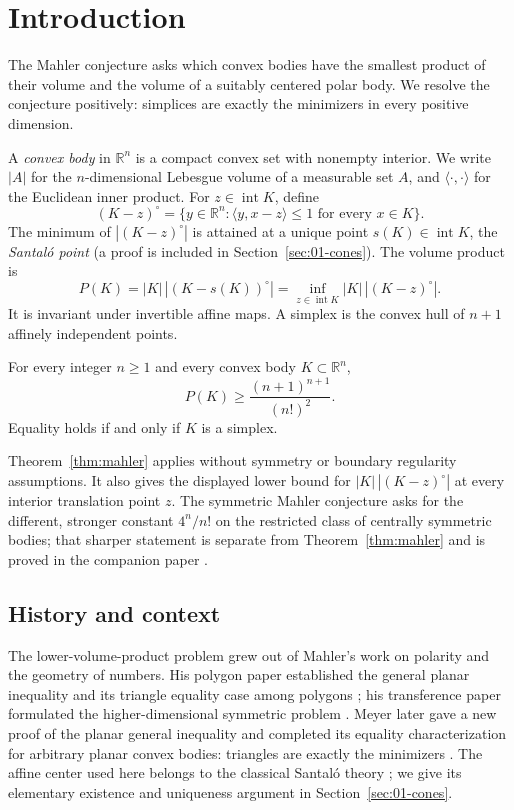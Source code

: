 \section{Introduction}\label{sec:introduction}

The Mahler conjecture asks which convex bodies have the smallest product
of their volume and the volume of a suitably centered polar body.
We resolve the conjecture positively: simplices are exactly the minimizers
in every positive dimension.

A \emph{convex body} in $\mathbb R^n$ is a compact convex set with nonempty
interior.  We write $|A|$ for the $n$-dimensional Lebesgue volume of a measurable
set $A$, and $\langle\cdot,\cdot\rangle$ for the Euclidean inner product.
For $z\in\operatorname{int}K$, define
\[
 (K-z)^\circ
 =\{y\in\mathbb R^n:\langle y,x-z\rangle\le1\text{ for every }x\in K\}.
\]
The minimum of $|(K-z)^\circ|$ is attained at a unique point
$s(K)\in\operatorname{int}K$, the \emph{Santal\'o point}
(a proof is included in Section~\ref{sec:01-cones}). The volume product is
\[
 P(K)=|K|\,|(K-s(K))^\circ|
     =\inf_{z\in\operatorname{int}K}|K|\,|(K-z)^\circ|.
\]
It is invariant under invertible affine maps.
A simplex is the convex hull of $n+1$ affinely independent points.

\begin{theorem}\label{thm:mahler}
For every integer $n\ge1$ and every convex body $K\subset\mathbb R^n$,
\[
                 P(K)\ge\frac{(n+1)^{n+1}}{(n!)^2}.
\]
Equality holds if and only if $K$ is a simplex.
\end{theorem}

Theorem~\ref{thm:mahler} applies without symmetry or boundary regularity assumptions.
It also gives the displayed lower bound for
$|K|\,|(K-z)^\circ|$ at every interior translation point $z$.
The symmetric Mahler conjecture asks for the different, stronger constant
$4^n/n!$ on the restricted class of centrally symmetric bodies; that sharper
statement is separate from Theorem~\ref{thm:mahler} and is proved in the
companion paper \cite[Theorem~1.1]{OpenAISymmetricMahler2026}.

\subsection*{History and context}

The lower-volume-product problem grew out of Mahler's work on polarity
and the geometry of numbers. His polygon paper established the general
planar inequality and its triangle equality case among polygons
\cite{Mahler1938}; his transference paper formulated the
higher-dimensional symmetric problem \cite{Mahler1939}.
Meyer later gave a new proof of the planar general inequality and
completed its equality characterization for arbitrary planar convex
bodies: triangles are exactly the minimizers \cite{Meyer1991}. The affine center used here belongs to the classical
Santal\'o theory \cite{Santalo1949}; we give its elementary existence
and uniqueness argument in Section~\ref{sec:01-cones}.

